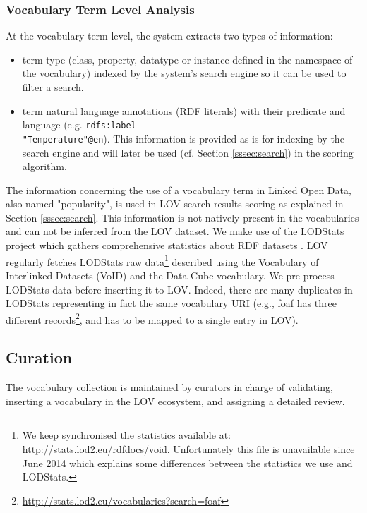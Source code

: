\documentclass{iosart2c}
\newcommand{\maria}[1]{\textcolor{blue}{\textbf{[MARIA:#1]}}}
\begin{document}
\subsubsection{Vocabulary Term Level Analysis}
At the vocabulary term level, the system extracts two types of information:
\begin{itemize}
\item term type (class, property, datatype or instance defined in the namespace of the vocabulary) indexed by the system's search engine so it can be used to filter a search.
\item term natural language annotations (RDF literals) with their predicate and language (e.g. {\small\texttt{rdfs:label}}\\ {\small\texttt{"Temperature"@en}}). This information is provided as is for indexing by the search engine and will later be used (cf. Section \ref{sssec:search}) in the scoring algorithm.
\end{itemize}

The information concerning the use of a vocabulary term in Linked Open Data, also named "popularity", is used in LOV search results scoring as explained in Section \ref{sssec:search}. This information is not natively present in the vocabularies and can not be inferred from the LOV dataset. We make use of the LODStats project which gathers comprehensive statistics about RDF datasets \cite{demter-2012-ekaw}. LOV regularly fetches LODStats raw data\footnote{We keep synchronised the statistics available at: \url{http://stats.lod2.eu/rdfdocs/void}. Unfortunately this file is unavailable since June 2014 which explains some differences between the statistics we use and LODStats.} described using the Vocabulary of Interlinked Datasets (VoID) \cite{void2009} and the Data Cube vocabulary. We pre-process LODStats data before inserting it to LOV. Indeed, there are many duplicates in LODStats representing in fact the same vocabulary URI (e.g., foaf has three different records\footnote{\url{http://stats.lod2.eu/vocabularies?search=foaf}}, and has to be mapped to a single entry in LOV).

\subsection{Curation}
The vocabulary collection is maintained by curators in charge of validating, inserting a vocabulary in the LOV ecosystem, and assigning a detailed review.

\end{document}
